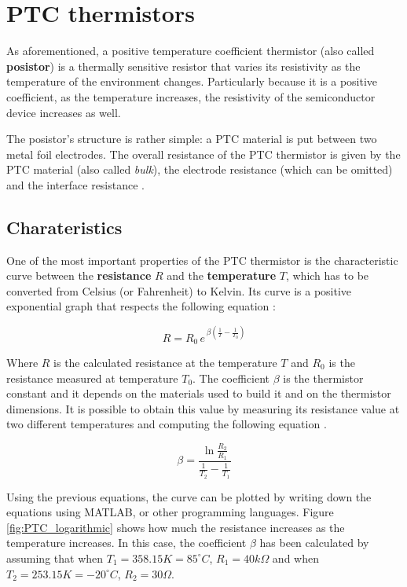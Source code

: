 \vspace{30px}\section{PTC thermistors}
As aforementioned, a positive temperature coefficient thermistor (also called \textbf{posistor}) is a thermally sensitive resistor that varies its resistivity as the temperature of the environment changes. Particularly because it is a positive coefficient, as the temperature increases, the resistivity of the semiconductor device increases as well.

The posistor's structure is rather simple: a PTC material is put between two metal foil electrodes. The overall resistance of the PTC thermistor is given by the PTC material (also called \textsl{bulk}), the electrode resistance (which can be omitted) and the interface resistance \cite{Tang2023}. 

\subsection{Charateristics}
One of the most important properties of the PTC thermistor is the characteristic curve between the \textbf{resistance} $R$ and the \textbf{temperature} $T$, which has to be converted from Celsius (or Fahrenheit) to Kelvin. Its curve is a positive exponential graph that respects the following equation \cite{Saburi196353}\cite{jones2010biomedical}:

\begin{equation*}
    R = R_0 \, e^{\, \beta\left( \frac{1}{T} - \frac{1}{T_0}\right)}
\end{equation*}

\noindent Where $R$ is the calculated resistance at the temperature $T$ and $R_0$ is the resistance measured at temperature $T_0$. The coefficient $\beta$ is the thermistor constant and it depends on the materials used to build it and on the thermistor dimensions. It is possible to obtain this value by measuring its resistance value at two different temperatures and computing the following equation \cite{Saburi196353}.

\begin{equation*}
    \beta = \frac{\ln{\frac{R_2}{R_1}}}{\frac{1}{T_2} - \frac{1}{T_1}}
\end{equation*}

\noindent Using the previous equations, the curve can be plotted by writing down the equations using MATLAB, or other programming languages. Figure \ref{fig:PTC_logarithmic} shows how much the resistance increases as the temperature increases. In this case, the coefficient $\beta$ has been calculated by assuming that when $T_1 = 358.15 K = 85^\circ C$, $R_1 = 40k\Omega$ and when $T_2 = 253.15 K = -20^\circ C$, $R_2 = 30\Omega$.

